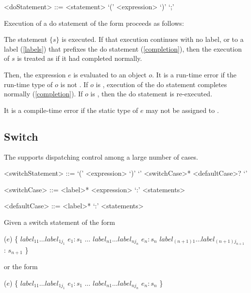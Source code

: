 \documentclass[makeidx]{article}
\begin{document}
{\begin{grammar}
<doStatement> ::= \DO{} <statement> \WHILE{} `(' <expression> `)' `;'
\end{grammar}

\LMHash{}%
Execution of a do statement of the form  proceeds as follows:

\LMHash{}%
The statement $\{s\}$ is executed.
If that execution continues with no label, or to a label (\ref{labels}) that prefixes the do statement (\ref{completion}), then the execution of $s$ is treated as if it had completed normally.

\LMHash{}%
Then, the expression $e$ is evaluated to an object $o$.
It is a run-time error if the run-time type of $o$ is not .
If $o$ is \FALSE{}, execution of the do statement completes normally (\ref{completion}).
If $o$ is \TRUE{}, then the do statement is re-executed.

\LMHash{}%
It is a compile-time error if the static type of $e$ may not be assigned to .


\subsection{Switch}

\LMHash{}%
The  supports dispatching control among a large number of cases.

\begin{grammar}
<switchStatement> ::= \gnewline{}
  \SWITCH{} `(' <expression> `)' `{' <switchCase>* <defaultCase>? `}'

<switchCase> ::= <label>* \CASE{} <expression> `:' <statements>

<defaultCase> ::= <label>* \DEFAULT{} `:' <statements>
\end{grammar}

\LMHash{}%
 Given a switch statement of the form

\begin{dartCode}
\SWITCH{} ($e$) \{
   $label_{11} \ldots label_{1j_1}$ \CASE{} $e_1: s_1$
   $\ldots$
   $label_{n1} \ldots label_{nj_n}$ \CASE{} $e_n: s_n$
   $label_{(n+1)1} \ldots label_{(n+1)j_{n+1}}$ \DEFAULT{}: $s_{n+1}$
\}
\end{dartCode}

or the form

\begin{dartCode}
\SWITCH{} ($e$) \{
   $label_{11} \ldots label_{1j_1}$ \CASE{} $e_1: s_1$
   $\ldots$
   $label_{n1} \ldots label_{nj_n}$ \CASE{} $e_n: s_n$
\}
\end{dartCode}

}
\end{document}
